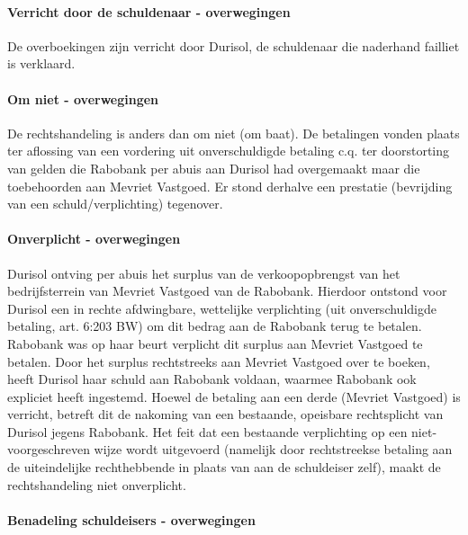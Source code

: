 \documentclass[
  dutch,
  a4paper,
]{article}
\begin{document}
\paragraph{Verricht door de schuldenaar - overwegingen}\label{verricht-door-de-schuldenaar---overwegingen-14}

De overboekingen zijn verricht door Durisol, de schuldenaar die naderhand failliet is verklaard.

\paragraph{Om niet - overwegingen}\label{om-niet---overwegingen-14}

De rechtshandeling is anders dan om niet (om baat). De betalingen vonden plaats ter aflossing van een vordering uit onverschuldigde betaling c.q. ter doorstorting van gelden die Rabobank per abuis aan Durisol had overgemaakt maar die toebehoorden aan Mevriet Vastgoed. Er stond derhalve een prestatie (bevrijding van een schuld/verplichting) tegenover.

\paragraph{Onverplicht - overwegingen}\label{onverplicht---overwegingen-14}

Durisol ontving per abuis het surplus van de verkoopopbrengst van het bedrijfsterrein van Mevriet Vastgoed van de Rabobank. Hierdoor ontstond voor Durisol een in rechte afdwingbare, wettelijke verplichting (uit onverschuldigde betaling, art. 6:203 BW) om dit bedrag aan de Rabobank terug te betalen. Rabobank was op haar beurt verplicht dit surplus aan Mevriet Vastgoed te betalen. Door het surplus rechtstreeks aan Mevriet Vastgoed over te boeken, heeft Durisol haar schuld aan Rabobank voldaan, waarmee Rabobank ook expliciet heeft ingestemd. Hoewel de betaling aan een derde (Mevriet Vastgoed) is verricht, betreft dit de nakoming van een bestaande, opeisbare rechtsplicht van Durisol jegens Rabobank. Het feit dat een bestaande verplichting op een niet-voorgeschreven wijze wordt uitgevoerd (namelijk door rechtstreekse betaling aan de uiteindelijke rechthebbende in plaats van aan de schuldeiser zelf), maakt de rechtshandeling niet onverplicht.

\paragraph{Benadeling schuldeisers - overwegingen}\label{benadeling-schuldeisers---overwegingen-14}
\end{document}
